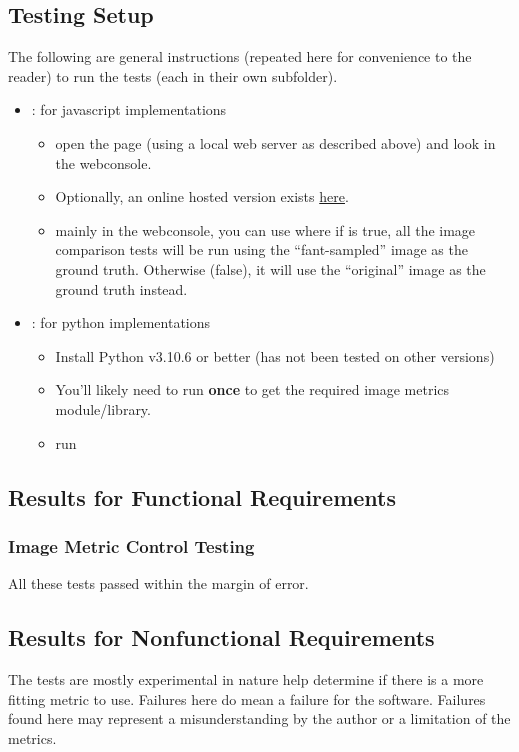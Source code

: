 \documentclass[12pt, titlepage]{article}
\begin{document}
\subsection{Testing Setup}
The following are general instructions (repeated here for convenience to the reader)
to run the tests (each in their own subfolder).
\begin{itemize}
  \item {}: for javascript implementations
  \begin{itemize}
    \item open the  page (using a local web server as described above)
      and look in the webconsole.
    \item Optionally, an online hosted version exists
    \href{https://joedf.github.io/ImgBeamer/tests/image_metrics/js-tests/}{here}.
    \item mainly in the webconsole, you can use  where if 
      is true, all the image comparison tests will be run using the ``fant-sampled'' image \cite{fant_1986} as
      the ground truth. Otherwise (false), it will use the ``original'' image as the ground truth instead.
  \end{itemize}
  \item {}: for python implementations
  \begin{itemize}
    \item Install Python v3.10.6 or better (has not been tested on other versions)
    \item You'll likely need to run  \textbf{once} to get the required
      image metrics module/library.
    \item run 
  \end{itemize}
\end{itemize}

\subsection{Results for Functional Requirements}
\subsubsection{Image Metric Control Testing}
All these tests passed within the margin of error.

\subsection{Results for Nonfunctional Requirements}
The tests are mostly experimental in nature help determine if there is a more fitting
metric to use. Failures here do mean a failure for the software.
Failures found here may represent a misunderstanding by the author or a limitation of the metrics.
\end{document}
